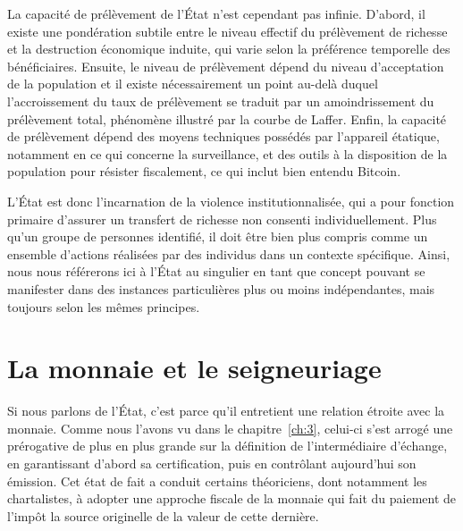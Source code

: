 La capacité de prélèvement de l'État n'est cependant pas infinie. D'abord, il existe une pondération subtile entre le niveau effectif du prélèvement de richesse et la destruction économique induite, qui varie selon la préférence temporelle des bénéficiaires. Ensuite, le niveau de prélèvement dépend du niveau d'acceptation de la population et il existe nécessairement un point au-delà duquel l'accroissement du taux de prélèvement se traduit par un amoindrissement du prélèvement total, phénomène illustré par la courbe de Laffer. Enfin, la capacité de prélèvement dépend des moyens techniques possédés par l'appareil étatique, notamment en ce qui concerne la surveillance, et des outils à la disposition de la population pour résister fiscalement, ce qui inclut bien entendu Bitcoin.

L'État est donc l'incarnation de la violence institutionnalisée, qui a pour fonction primaire d'assurer un transfert de richesse non consenti individuellement. Plus qu'un groupe de personnes identifié, il doit être bien plus compris comme un ensemble d'actions réalisées par des individus dans un contexte spécifique. Ainsi, nous nous référerons ici à l'État au singulier en tant que concept pouvant se manifester dans des instances particulières plus ou moins indépendantes, mais toujours selon les mêmes principes. %

\section*{La monnaie et le seigneuriage}

Si nous parlons de l'État, c'est parce qu'il entretient une relation étroite avec la monnaie. Comme nous l'avons vu dans le chapitre~\ref{ch:3}, celui-ci s'est arrogé une prérogative de plus en plus grande sur la définition de l'intermédiaire d'échange, en garantissant d'abord sa certification, puis en contrôlant aujourd'hui son émission. Cet état de fait a conduit certains théoriciens, dont notamment les chartalistes, à adopter une approche fiscale de la monnaie qui fait du paiement de l'impôt la source originelle de la valeur de cette dernière.

